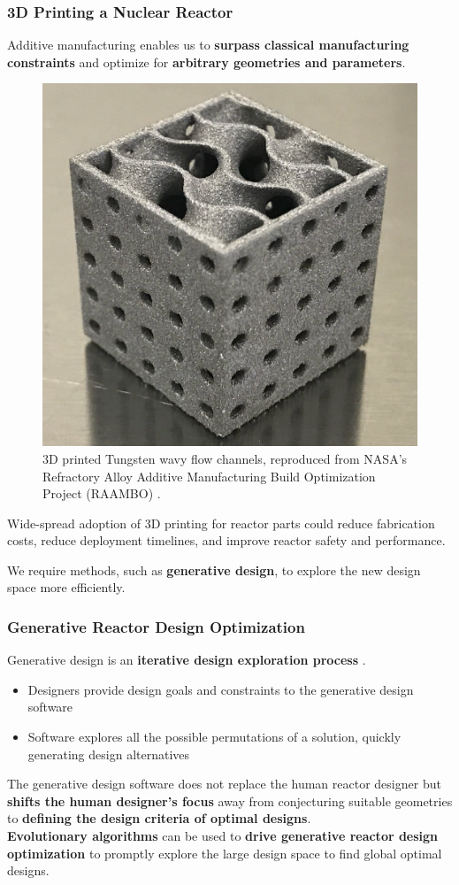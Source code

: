 \begin{frame}
    \frametitle{3D Printing a Nuclear Reactor}
    Additive manufacturing enables us to \textbf{surpass classical 
    manufacturing constraints} and optimize for \textbf{arbitrary geometries and 
    parameters}. 
    \begin{figure}[]
        \includegraphics[width=0.3\linewidth]{figures/tungsten-wavy-channels.png}
        \caption{3D printed Tungsten wavy flow channels, reproduced from NASA's Refractory 
        Alloy Additive Manufacturing Build Optimization Project (RAAMBO) 
        \cite{mireles_refractory_2022}.}
    \end{figure}
    \vspace{-0.2cm}
    Wide-spread adoption of 3D printing for reactor parts could reduce 
    fabrication costs, reduce deployment timelines, and improve reactor safety and 
    performance.

    \vspace{0.2cm}
    We require methods, such as \textbf{generative design}, to explore the 
    new design space more efficiently. 
\end{frame}

  \begin{frame}
    \frametitle{Generative Reactor Design Optimization}
    Generative design is an \textbf{iterative design exploration process} \cite{autodesk_autodesk_2020}. 
    \begin{itemize}
        \item Designers provide design goals and constraints to the generative design 
        software
        \item Software explores all the possible permutations of a solution, quickly generating 
        design alternatives
    \end{itemize}
    \vspace{0.2cm}
    The generative design software does not replace the human reactor designer but 
    \textbf{shifts the human designer's focus} away from conjecturing suitable geometries 
    to \textbf{defining the design criteria of optimal designs}. \\

    \textbf{Evolutionary algorithms} can be used to \textbf{drive generative reactor 
    design optimization} to promptly explore the large design space to find global optimal 
    designs. 
  \end{frame}

